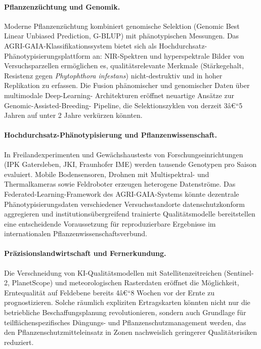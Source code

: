 \documentclass[a4paper, 12pt, twoside, openright]{report}
\theoremstyle{definition}
\theoremstyle{definition}
\begin{document}
\paragraph{Pflanzenzüchtung und Genomik.}
Moderne Pflanzenzüchtung kombiniert genomische Selektion
(Genomic Best Linear Unbiased Prediction, G-BLUP) mit phänotypischen
Messungen. Das AGRI-GAIA-Klassifikationssystem bietet sich als
Hochdurchsatz-Phänotypisierungsplattform an: NIR-Spektren und
hyperspektrale Bilder von Versuchsparzellen ermöglichen es, qualitätsrelevante
Merkmale (Stärkegehalt, Resistenz gegen \textit{Phytophthora infestans})
nicht-destruktiv und in hoher Replikation zu erfassen. Die Fusion
phänomischer und genomischer Daten über multimodale Deep-Learning-
Architekturen eröffnet neuartige Ansätze zur Genomic-Assisted-Breeding-
Pipeline, die Selektionszyklen von derzeit 3â€“5 Jahren auf unter 2 Jahre
verkürzen könnten.

\paragraph{Hochdurchsatz-Phänotypisierung und Pflanzenwissenschaft.}
In Freilandexperimenten und Gewächshaustests von Forschungseinrichtungen
(IPK Gatersleben, JKI, Fraunhofer IME) werden tausende Genotypen pro
Saison evaluiert. Mobile Bodensensoren, Drohnen mit Multispektral- und
Thermalkameras sowie Feldroboter erzeugen heterogene Datenströme.
Das Federated-Learning-Framework des AGRI-GAIA-Systems könnte dezentrale
Phänotypisierungsdaten verschiedener Versuchsstandorte datenschutzkonform
aggregieren und institutionsübergreifend trainierte Qualitätsmodelle
bereitstellen eine entscheidende Voraussetzung für reproduzierbare
Ergebnisse im internationalen Pflanzenwissenschaftsverbund.

\paragraph{Präzisionslandwirtschaft und Fernerkundung.}
Die Verschneidung von KI-Qualitäts\-modellen mit Satellitenzeitreichen
(Sentinel-2, PlanetScope) und meteorologischen Raster\-daten eröffnet die
Möglichkeit, Erntequalität auf Feldebene bereits 4â€“8 Wochen vor der Ernte
zu prognostizieren. Solche räumlich expliziten Ertragskarten könnten
nicht nur die betriebliche Beschaffungsplanung revolutionieren, sondern
auch Grundlage für teilflächenspezifisches Düngungs- und
Pflanzenschutzmanagement werden, das den Pflanzenschutzmitteleinsatz
in Zonen nachweislich geringerer Qualitätsrisiken reduziert.
\end{document}
